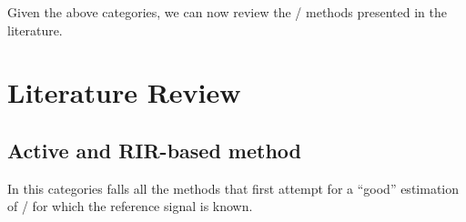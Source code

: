 

Given the above categories, we can now review the \AER/ methods presented in the literature.

\section{Literature Review}\label{sec:estimation:sota}

\subsection{Active and RIR-based method}
In this categories falls all the methods that first attempt for a ``good'' estimation of \RIRs/ for which the reference signal is known.

